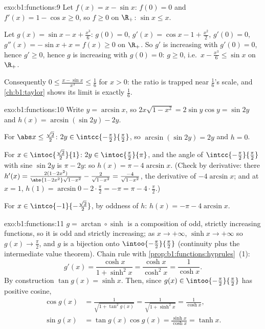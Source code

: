 \begin{solution}{exo:b1:functions:9}
Let $f(x) = x - \sin x$: $f(0) = 0$ and $f'(x) = 1 - \cos x \geq 0$,
so $f \geq 0$ on $\R_+$: $\sin x \leq x$.

Let $g(x) = \sin x - x + \frac{x^3}{6}$: $g(0) = 0$, $g'(x) = \cos x -
1 + \frac{x^2}{2}$, $g'(0) = 0$, $g''(x) = -\sin x + x = f(x) \geq 0$
on $\R_+$. So $g'$ is increasing with $g'(0) = 0$, hence $g' \geq 0$,
hence $g$ is increasing with $g(0) = 0$: $g \geq 0$, i.e.\ $x -
\frac{x^3}{6} \leq \sin x$ on $\R_+$.

Consequently $0 \leq \frac{x - \sin x}{x^3} \leq \frac 16$ for $x >
0$: the ratio is trapped near $\frac16$'s scale, and
\cref{ch:b1:taylor} shows its limit is exactly $\frac 16$.
\end{solution}

\begin{solution}{exo:b1:functions:10}
Write $y = \arcsin x$, so $2x\sqrt{1 - x^2} = 2\sin y\cos y = \sin
2y$ and $h(x) = \arcsin(\sin 2y) - 2y$.

For $\abs x \leq \frac{\sqrt 2}{2}$: $2y \in
\intcc{-\frac\pi2}{\frac\pi2}$, so $\arcsin(\sin 2y) = 2y$ and $h =
0$.

For $x \in \intoc{\frac{\sqrt 2}{2}}{1}$: $2y \in
\intoc{\frac\pi2}{\pi}$, and the angle of
$\intcc{-\frac\pi2}{\frac\pi2}$ with sine $\sin 2y$ is $\pi - 2y$:
so $h(x) = \pi - 4\arcsin x$. (Check by derivative: there
$h'(x) = \frac{2(1 - 2x^2)}{\abs{1 - 2x^2}\sqrt{1 - x^2}} -
\frac{2}{\sqrt{1-x^2}} = \frac{-4}{\sqrt{1 - x^2}}$, the derivative
of $-4\arcsin x$; and at $x = 1$, $h(1) = \arcsin 0 - 2\cdot\frac\pi2
= -\pi = \pi - 4\cdot\frac\pi2$.)

For $x \in \intco{-1}{-\frac{\sqrt 2}{2}}$, by oddness of $h$:
$h(x) = -\pi - 4\arcsin x$.
\end{solution}

\begin{solution}{exo:b1:functions:11}
$g = \arctan \circ \sinh$ is a composition of odd, strictly
increasing functions, so it is odd and strictly increasing; as $x \to
+\infty$, $\sinh x \to +\infty$ so $g(x) \to \frac\pi2$, and $g$ is a
bijection onto $\intoo{-\frac\pi2}{\frac\pi2}$ (continuity plus the
intermediate value theorem). Chain rule with
\cref{prop:b1:functions:hyprules}~(1):
\[
g'(x) = \frac{\cosh x}{1 + \sinh^2 x} = \frac{\cosh x}{\cosh^2 x}
= \frac{1}{\cosh x} .
\]
By construction $\tan g(x) = \sinh x$. Then, since $g(x) \in
\intoo{-\frac\pi2}{\frac\pi2}$ has positive cosine,
\begin{align*}
\cos g(x) &= \frac{1}{\sqrt{1 + \tan^2 g(x)}}
= \frac{1}{\sqrt{1 + \sinh^2 x}} = \frac{1}{\cosh x},\\
\sin g(x) &= \tan g(x) \cos g(x) = \frac{\sinh x}{\cosh x} = \tanh x .
\end{align*}
\end{solution}

